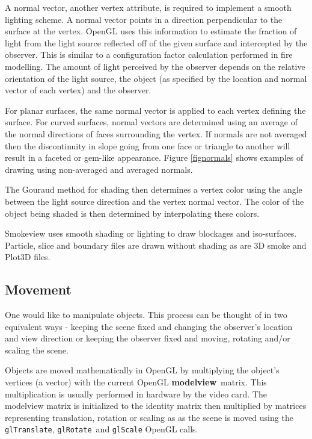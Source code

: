 A normal vector, another vertex attribute, is required to
implement a smooth lighting scheme. A normal vector points in a
direction perpendicular to the surface at the vertex. OpenGL uses
this information to estimate the fraction of light from the light
source reflected off of the given surface and intercepted by the
observer.  This is similar to a configuration factor calculation
performed in fire modelling.  The amount of light perceived by the
observer depends on the relative orientation of the light source,
the object (as specified by the location and normal vector of each
vertex) and the observer.

For planar surfaces, the same normal vector is applied to each
vertex defining the surface. For curved surfaces, normal vectors
are determined using an average of the normal directions of faces
surrounding the vertex.  If normals are not averaged then the
discontinuity in slope going from one face or triangle to another
will result in a faceted or gem-like appearance.  Figure
\ref{fignormals} shows examples of drawing using non-averaged and
averaged normals.

The Gouraud method for shading then determines a vertex color
using the angle between the light source direction and the vertex
normal vector. The color of the object being shaded is then
determined by interpolating these colors.

Smokeview uses smooth shading or lighting to draw blockages and
iso-surfaces. Particle, slice and boundary files are drawn without
shading as are 3D smoke and Plot3D files.



\subsection{Movement} One would like to manipulate objects.  This process can be thought
of in two equivalent ways - keeping the scene fixed and changing
the observer's location and view direction or keeping the observer
fixed and moving, rotating and/or scaling the scene.

Objects are moved mathematically in OpenGL by multiplying the
object's vertices (a vector) with the current OpenGL {\bf
modelview}\ matrix.  This multiplication is usually performed in
hardware by the video card.  The modelview matrix is initialized
to the identity matrix then multiplied by matrices representing
translation, rotation or scaling as as the scene is moved using
the {\tt glTranslate}, {\tt glRotate}\ and {\tt glScale} OpenGL
calls.

